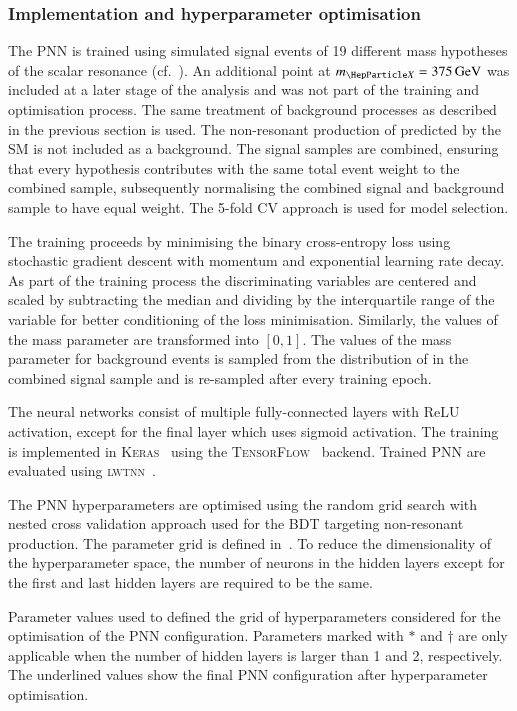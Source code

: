 \subsubsection{Implementation and hyperparameter optimisation}

The PNN is trained using simulated signal events of 19 different mass
hypotheses of the scalar resonance (cf.~). An
additional point at $\mX = \SI{375}{\GeV}$ was included at a later
stage of the analysis and was not part of the training and
optimisation process. The same treatment of background processes as
described in the previous section is used. The non-resonant production
of \HH predicted by the SM is not included as a background.
The signal samples are combined, ensuring that every \mX hypothesis
contributes with the same total event weight to the combined sample,
subsequently normalising the combined signal and background sample to
have equal weight. The 5-fold CV approach is used for model selection.

The training proceeds by minimising the binary cross-entropy loss
using stochastic gradient descent with momentum and exponential
learning rate decay. As part of the training process the
discriminating variables are centered and scaled by subtracting the
median and dividing by the interquartile range of the variable for
better conditioning of the loss minimisation. Similarly, the values of
the mass parameter are transformed into $[0, 1]$. The values of the
mass parameter for background events is sampled from the distribution
of \mX in the combined signal sample and is re-sampled after every
training epoch.

The neural networks consist of multiple fully-connected layers with
ReLU activation, except for the final layer which uses sigmoid
activation. The training is implemented in \textsc{Keras}~\cite{keras}
using the \textsc{TensorFlow}~\cite{tensorflow2015-whitepaper}
backend. Trained PNN are evaluated using \textsc{lwtnn}~\cite{lwtnn}.

The PNN hyperparameters are optimised using the random grid search
with nested cross validation approach used for the BDT targeting
non-resonant \HH production. The parameter grid is defined
in~. To reduce the dimensionality of
the hyperparameter space, the number of neurons in the hidden layers
except for the first and last hidden layers are required to be the
same.

\begin{table}[htbp]
  \centering
  
  \caption{Parameter values used to defined the grid of
    hyperparameters considered for the optimisation of the PNN
    configuration. Parameters marked with $*$ and $\dagger$ are only
    applicable when the number of hidden layers is larger than 1 and
    2, respectively. The underlined values show the final PNN
    configuration after hyperparameter optimisation.}
  \label{tab:hyperparameter_grid_pnn}
\end{table}

